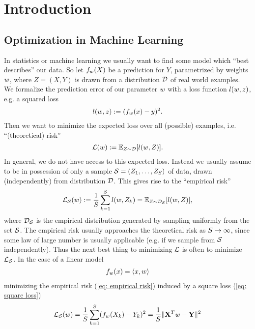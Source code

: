 
\chapter{Introduction}

\section{Optimization in Machine Learning}

In statistics or machine learning we usually want to find some model
which ``best describes'' our data. So let \(f_{w}(X)\) be a prediction for
\(Y\), parametrized by weights \(w\), where \(Z=(X,Y)\) is drawn from a
distribution \(\mathcal{D}\) of real world examples. We formalize the prediction error
of our parameter \(w\) with a loss function \(l(w, z)\), e.g. 
a squared loss
%
\begin{align}\label{eq: square loss}
	l(w, z) := (f_{w}(x) - y)^2.
\end{align}
%
Then we want to minimize the expected loss over all (possible) examples, i.e.
``(theoretical) risk''
%
\begin{align*}
	\mathcal{L}(w) := \mathbb{E}_{Z\sim \mathcal{D}} [l(w, Z)].
\end{align*}
In general, we do not have access to this expected loss. Instead we usually
assume to be in possession of only a sample \(\mathcal{S}=(Z_1, \dots,
Z_{S})\) of data, drawn (independently) from distribution \(\mathcal{D}\).
This gives rise to the ``empirical risk''
\begin{align}\label{eq: empirical risk}
	\mathcal{L}_{\mathcal{S}}(w)
	:= \frac{1}{S}\sum_{k=1}^S l(w, Z_k)
	= \mathbb{E}_{Z\sim \mathcal{D}_{\mathcal{S}}}[l(w, Z)],
\end{align}
where \(\mathcal{D}_{\mathcal{S}}\) is the empirical distribution generated by sampling
uniformly from the set \(\mathcal{S}\). The empirical risk usually approaches
the theoretical risk as \(S\to\infty\), since some law of large number
is usually applicable (e.g. if we sample from \(\mathcal{S}\) independently). Thus the
next best thing to minimizing \(\mathcal{L}\) is often to minimize \(\mathcal{L}_{\mathcal{S}}\).
In the case of a linear model
\begin{align*}
	f_{w}(x) = \langle x, w \rangle
\end{align*}
minimizing the empirical risk (\ref{eq: empirical risk}) induced by a square
loss (\ref{eq: square loss})
\begin{align*}
	\mathcal{L}_{\mathcal{S}}(w)
	= \frac{1}{S}\sum_{k=1}^S (f_{w}(X_k)-Y_k)^2
	= \frac{1}{S}\| \mathbf{X}^Tw - \mathbf{Y}\|^2
\end{align*}
